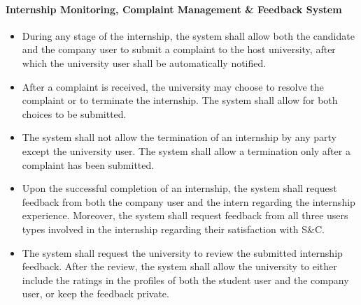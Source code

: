 \paragraph{Internship Monitoring, Complaint Management \& Feedback System}
\begin{itemize}[label={[\textbf{FR}]}, align=left, leftmargin=*]
    \item {} During any stage of the internship, the system shall allow both the candidate and the company user to submit a complaint to the host university, after which the university user shall be automatically notified.
    \item {} After a complaint is received, the university may choose to resolve the complaint or to terminate the internship. The system shall allow for both choices to be submitted.
    \item {} The system shall not allow the termination of an internship by any party except the university user. The system shall allow a termination only after a complaint has been submitted.
    \item {} Upon the successful completion of an internship, the system shall request feedback from both the company user and the intern regarding the internship experience. Moreover, the system shall request feedback from all three users types involved in the internship regarding their satisfaction with S\&C.
    \item {} The system shall request the university to review the submitted internship feedback. After the review, the system shall allow the university to either include the ratings in the profiles of both the student user and the company user, or keep the feedback private.
\end{itemize}


